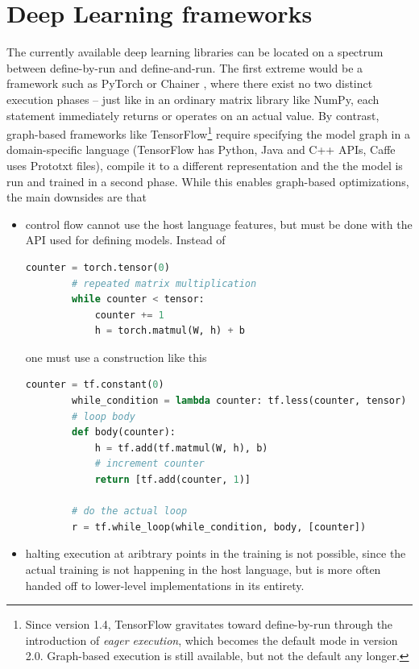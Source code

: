 \hypertarget{sec:dl-frameworks}{%
\section{Deep Learning frameworks}\label{sec:dl-frameworks}}

The currently available deep learning libraries can be located on a spectrum
between define-by-run and define-and-run.  The first extreme would be a
framework such as PyTorch \citep{paszke2017automatic} or Chainer
\citep{tokui2015chainer} , where there exist no two distinct execution phases --
just like in an ordinary matrix library like NumPy, each statement immediately
returns or operates on an actual value. By contrast, graph-based frameworks like
TensorFlow\footnote{Since version 1.4, TensorFlow gravitates toward
    define-by-run through the introduction of \emph{eager execution}, which
becomes the default mode in version 2.0. Graph-based execution is still
available, but not the default any longer.} require specifying the model graph
in a domain-specific language (TensorFlow has Python, Java and C++ APIs, Caffe
uses Prototxt files), compile it to a different representation and the the model
is run and trained in a second phase. While this enables graph-based
optimizations, the main downsides are that

\begin{itemize}
    \item
        control flow cannot use the host language features, but must be done
        with the API used for defining models. Instead of

        \begin{lstlisting}[language=Python, label=lst:whilepy-pt]
        counter = torch.tensor(0)
        # repeated matrix multiplication
        while counter < tensor:
            counter += 1
            h = torch.matmul(W, h) + b
        \end{lstlisting}

        one must use a construction like this
        \begin{lstlisting}[language=Python, label=lst:whilepy-tf]
        counter = tf.constant(0)
        while_condition = lambda counter: tf.less(counter, tensor)
        # loop body
        def body(counter):
            h = tf.add(tf.matmul(W, h), b)
            # increment counter
            return [tf.add(counter, 1)]

        # do the actual loop
        r = tf.while_loop(while_condition, body, [counter])
    \end{lstlisting}
\item
    halting execution at aribtrary points in the training is not possible,
    since the actual training is not happening in the host language, but
    is more often handed off to lower-level implementations in its
    entirety.
\end{itemize}

